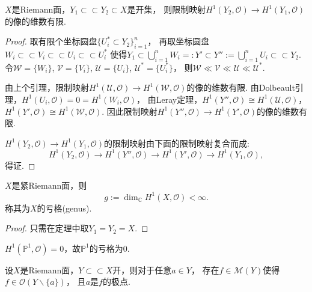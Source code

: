\begin{theorem}
	$X$是Riemann面，$Y_1\subset \subset Y_2\subset X$是开集，
    则限制映射$H^1(Y_2,\mathcal{O})\rightarrow H^1(Y_1,\mathcal{O})$的像的维数有限.
\end{theorem}
		
\begin{proof}
	取有限个坐标圆盘$\{U_i^*\subset Y_2\}_{i=1}^n$，
    再取坐标圆盘$W_i\subset \subset V_i\subset \subset U_i\subset \subset U_i^*$
    使得$Y_1\subset \bigcup\limits_{i=1}^n W_i=:Y'\subset Y''
    :=\bigcup\limits_{i=1}^n U_i \subset \subset Y_2$. 
    令$\mathscr{W}=\{W_i\}$, $\mathscr{V}=\{V_i\}$, 
    $\mathscr{U}=\{U_i\}$, $\mathscr{U}^*=\{U_i^*\}$，
    则$\mathscr{W}\ll\mathscr{V}\ll\mathscr{U}\ll\mathscr{U}^*$.

	由上个引理，限制映射$H^1(\mathscr{U}, \mathcal{O})
    \rightarrow H^1(\mathscr{W},\mathcal{O})$的像的维数有限. 
    由Dolbeault引理，$H^1(U_i,\mathcal{O})=0=H^1(W_i,\mathcal{O})$，
    由Leray定理，$H^1(Y'',\mathcal{O})\cong H^1(\mathscr{U},\mathcal{O})$，
    $H^1(Y',\mathcal{O})\cong H^1(\mathscr{W},\mathcal{O})$. 
    因此限制映射$H^1(Y'',\mathcal{O})\rightarrow H^1(Y',\mathcal{O})$的像的维数有限.

	$H^1(Y_2,\mathcal{O})\rightarrow H^1(Y_1,\mathcal{O})$的限制映射由下面的限制映射复合而成:
	$$H^1(Y_2, \mathcal{O})\rightarrow H^1(Y'',\mathcal{O} )
    \rightarrow H^1(Y',\mathcal{O} )\rightarrow H^1(Y_1, \mathcal{O}),$$
	得证.
\end{proof}

\begin{corollary}
    $X$是紧Riemann面，则
	$$g:=\dim_{\mathbb{C}} H^1(X,\mathcal{O})<\infty.$$
	称其为$X$的亏格(genus).
\end{corollary}

\begin{proof}
	只需在定理中取$Y_1=Y_2=X$.
\end{proof}

\begin{example}
	$H^1(\mathbb{P}^1,\mathcal{O})=0$，故$\mathbb{P}^1$的亏格为$0$.
\end{example}

\begin{theorem}
	设$X$是Riemann面，$Y\subset \subset X$开，则对于任意$a\in Y$，
    存在$f\in \mathscr{M}(Y)$使得$f\in \mathcal{O}(Y\backslash \{a\})$，
    且$a$是$f$的极点.
\end{theorem}

